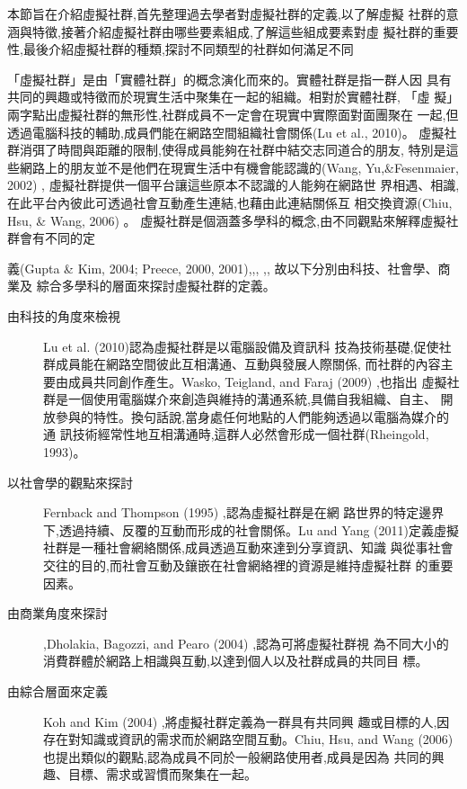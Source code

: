 


本節旨在介紹虛擬社群,首先整理過去學者對虛擬社群的定義,以了解虛擬
社群的意涵與特徵,接著介紹虛擬社群由哪些要素組成,了解這些組成要素對虛
擬社群的重要性,最後介紹虛擬社群的種類,探討不同類型的社群如何滿足不同


「虛擬社群」是由「實體社群」的概念演化而來的。實體社群是指一群人因
具有共同的興趣或特徵而於現實生活中聚集在一起的組織。相對於實體社群,
「虛
擬」兩字點出虛擬社群的無形性,社群成員不一定會在現實中實際面對面團聚在
一起,但透過電腦科技的輔助,成員們能在網路空間組織社會關係(Lu et al., 2010)。
虛擬社群消弭了時間與距離的限制,使得成員能夠在社群中結交志同道合的朋友,
特別是這些網路上的朋友並不是他們在現實生活中有機會能認識的(Wang, Yu,\&Fesenmaier, 2002) ,
虛擬社群提供一個平台讓這些原本不認識的人能夠在網路世
界相遇、相識,在此平台內彼此可透過社會互動產生連結,也藉由此連結關係互
相交換資源(Chiu, Hsu, \& Wang, 2006) 。
虛擬社群是個涵蓋多學科的概念,由不同觀點來解釋虛擬社群會有不同的定


義(Gupta \& Kim, 2004; Preece, 2000, 2001),,,
,,
故以下分別由科技、社會學、商業及
綜合多學科的層面來探討虛擬社群的定義。

\begin{description}
\item[由科技的角度來檢視] Lu et al. (2010)認為虛擬社群是以電腦設備及資訊科
技為技術基礎,促使社群成員能在網路空間彼此互相溝通、互動與發展人際關係,
而社群的內容主要由成員共同創作產生。Wasko, Teigland, and Faraj (2009) ,也指出
虛擬社群是一個使用電腦媒介來創造與維持的溝通系統,具備自我組織、自主、
開放參與的特性。換句話說,當身處任何地點的人們能夠透過以電腦為媒介的通
訊技術經常性地互相溝通時,這群人必然會形成一個社群(Rheingold, 1993)。
\item[以社會學的觀點來探討] Fernback and Thompson (1995) ,認為虛擬社群是在網
路世界的特定邊界下,透過持續、反覆的互動而形成的社會關係。Lu and Yang
(2011)定義虛擬社群是一種社會網絡關係,成員透過互動來達到分享資訊、知識
與從事社會交往的目的,而社會互動及鑲嵌在社會網絡裡的資源是維持虛擬社群
的重要因素。
\item[由商業角度來探討] ,Dholakia, Bagozzi, and Pearo (2004) ,認為可將虛擬社群視
為不同大小的消費群體於網路上相識與互動,以達到個人以及社群成員的共同目
標。
\item[由綜合層面來定義] Koh and Kim (2004) ,將虛擬社群定義為一群具有共同興
趣或目標的人,因存在對知識或資訊的需求而於網路空間互動。Chiu, Hsu, and
Wang (2006)  也提出類似的觀點,認為成員不同於一般網路使用者,成員是因為
共同的興趣、目標、需求或習慣而聚集在一起。

\end{description}

